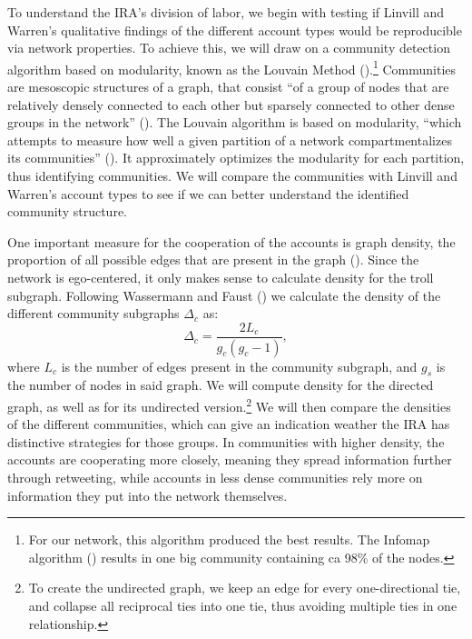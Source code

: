 \documentclass[12pt, titlepage=true, toc=bib]{scrartcl}
\begin{document}
To understand the IRA's division of labor, we begin with testing if Linvill and Warren's qualitative findings of the different account types would be reproducible via network properties. To achieve this, we will draw on a community detection algorithm based on modularity, known as the Louvain Method (\cite{blondel_fast_2008}).\footnote{For our network, this algorithm produced the best results. The Infomap algorithm (\cite[cf.][]{rosvall_maps_2008}) results in one big community containing ca 98\% of the nodes.} Communities are mesoscopic structures of a graph, that consist ``of a group of nodes that are relatively densely connected to each other but sparsely connected to other dense groups in the network'' (\cite[1083]{porter_communities_2009}). The Louvain algorithm is based on modularity, ``which attempts to measure how well a given partition of a network compartmentalizes its communities'' (\cites[1088]{porter_communities_2009}[cf. also]{blondel_fast_2008}). It approximately optimizes the modularity for each partition, thus identifying communities. We will compare the communities with Linvill and Warren's account types to see if we can better understand the identified community structure.

One important measure for the cooperation of the accounts is graph density, the proportion of all possible edges that are present in the graph (\cite[101]{wasserman_social_1994}). Since the network is ego-centered, it only makes sense to calculate density for the troll subgraph. Following Wassermann and Faust (\cite*[102]{wasserman_social_1994}) we calculate the density of the different community subgraphs \( \Delta_{c} \) as: \[ \Delta_{c} = \frac{2L_{c}}{g_{c}(g_{c} - 1)} ,\] where \( L_{c} \) is the number of edges present in the community subgraph, and \( g_{s} \) is the number of nodes in said graph. We will compute density for the directed graph, as well as for its undirected version.\footnote{To create the undirected graph, we keep an edge for every one-directional tie, and collapse all reciprocal ties into one tie, thus avoiding multiple ties in one relationship.} We will then compare the densities of the different communities, which can give an indication weather the IRA has distinctive strategies for those groups. In communities with higher density, the accounts are cooperating more closely, meaning they spread information further through retweeting, while accounts in less dense communities rely more on information they put into the network themselves.
\end{document}
